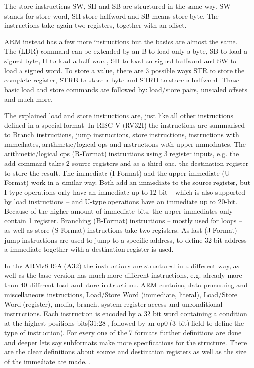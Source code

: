 \documentclass[conference]{IEEEtran}
\begin{document}
	The store instructions SW, SH and SB are structured in the same way. SW stands for store word, SH store halfword and SB means store byte. The instructions take again two registers, together with an offset.  \cite[slide 30ff]{Berkeley2019} 

	ARM instead has a few more instructions but the basics are almost the same. The (LDR) command can be extended by an B to load only a byte, SB to load a signed byte, H to load a half word, SH to load an signed halfword and SW to load a signed word. To store a value, there are 3 possible ways STR to store the complete register, STRB to store a byte and STRH to store a halfword. These basic load and store commands are followed by: load/store pairs, unscaled offsets and much more. \cite[page 207 - 218]{Arm2020}

	The explained load and store instructions are, just like all other instructions defined in a special format.
	In RISC-V (RV32I) the instructions are summarised to Branch instructions, jump instructions, store instructions, instructions with immediates, arithmetic/logical ops and instructions with upper immediates.
	The arithmetic/logical ops (R-Format) instructions using 3 register inputs, e.g. the add command takes 2 source registers and as a third one, the destination register to store the result.
	The immediate (I-Format) and the upper immediate (U-Format) work in a similar way. Both add an immediate to the source register, but I-type operations only have an immediate up to 12-bit -- which is also supported by load instructions -- and U-type operations have an immediate up to 20-bit. Because of the higher amount of immediate bits, the upper immediates only contain 1 register. Branching (B-Format) instructions -- mostly used for loops -- as well as store (S-Format) instructions take two registers. As last (J-Format) jump instructions are used to jump to a specific address, to define 32-bit address a immediate together with a destination register is used. \cite[slide 10 -64]{Ho}
	
	In the ARMv8 \gls{ISA} (A32) the instructions are structured in a different way, as well as the base version has much more different instructions, e.g. already more than 40 different load and store instructions. ARM contains, data-processing and miscellaneous instructions, Load/Store Word (immediate, literal), Load/Store Word (register), media, branch, system register access and unconditional instructions.	Each instruction is encoded by a 32 bit word containing a condition at the highest positions bits[31:28], followed by an op0 (3-bit) field to define the type of instruction). For every one of the 7 formats further definitions are done and deeper lets say subformats make more specifications for the structure. There are the clear definitions about source and destination registers as well as the size of the immediate are made. \cite[page 4218 - 4278]{Arm2020}.
	
\end{document}
